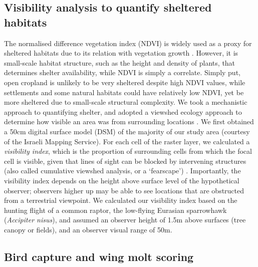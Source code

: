 \begin{refsection}
\subsection*{Visibility analysis to quantify sheltered habitats}
The normalised difference vegetation index (NDVI) is widely used as a proxy for sheltered habitats due to its relation with vegetation growth \citep{pettorelli2011}.
However, it is small-scale habitat structure, such as the height and density of plants, that determines shelter availability, while NDVI is simply a correlate. 
Simply put, open cropland is unlikely to be very sheltered despite high NDVI values, while settlements and some natural habitats could have relatively low NDVI, yet be more sheltered due to small-scale structural complexity.
We took a mechanistic approach to quantifying shelter, and adopted a viewshed ecology approach to determine how visible an area was from surrounding locations \citep{aben2018,aben2021}.
We first obtained a 50cm digital surface model (DSM) of the majority of our study area (courtesy of the Israeli Mapping Service).
For each cell of the raster layer, we calculated a \textit{visibility index}, which is the proportion of surrounding cells from which the focal cell is visible, given that lines of sight can be blocked by intervening structures (also called cumulative viewshed analysis, or a `fearscape') \cite{olsoy2015}.
Importantly, the visibility index depends on the height above surface level of the hypothetical observer; observers higher up may be able to see locations that are obstructed from a terrestrial viewpoint.
We calculated our visibility index based on the hunting flight of a common raptor, the low-flying Eurasian sparrowhawk (\textit{Accipiter nisus}), and assumed an observer height of 1.5m above surfaces (tree canopy or fields), and an observer visual range of 50m.

\subsection*{Bird capture and wing molt scoring}


\end{refsection}

